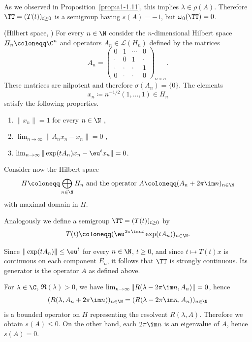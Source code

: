 As we observed in Proposition~\ref{prop:a1-1.11}, this implies $\lambda \in \rho(A)$.
Therefore $\TT = (T(t))_{t\geq 0}$ is a semigroup having $s(A) = -1$, but $\omega_{0}(\TT) = 0$.
\begin{example}\label{ex:a3-1.4}(Hilbert space, \textcite{zabczyk:1975})
For every $n \in \N$ consider the $n$-dimensional Hilbert space $H_{n} \coloneqq \C^{n}$ and operators $A_{n} \in \mathcal{L}(H_{n})$ defined by the matrices
\[
    A_{n} =
    \begin{pmatrix}
    0 & 1 & \cdots & 0 \\
    \cdot & 0 & 1 & \cdot \\
    \cdot & \cdot & \cdot & 1 \\
    0 & \cdot & \cdot & 0
    \end{pmatrix}_{n \times n} .
\]
These matrices are nilpotent and therefore $\sigma(A_{n}) = \{0\}$.
The elements 
\[
	x_{n} \coloneqq n^{-1/2}(1, \ldots, 1) \in H_{n}
\]
satisfy the following properties.
\begin{enumerate}[\upshape (i)]
\item
	$\|x_{n}\| = 1$ for every $n \in \N$ , 

\item
	$\lim_{n \to \infty} \|A_{n}x_{n} - x_{n}\| = 0$ , 

\item
	$\lim_{n \to \infty} \|\exp(tA_{n})x_{n} - \eu^{t}x_{n}\| = 0$. 

\end{enumerate}
Consider now the Hilbert space 
%
\[
	\text{$H \coloneqq \bigoplus_{n \in \N} H_{n}$ and the operator 
		$A \coloneqq (A_{n} + 2\pi\im n)_{n \in \N}$}
\]
%
with maximal domain in $H$.

Analogously we define a semigroup $\TT = (T(t))_{t \geq 0}$ by
\[
    T(t) \coloneqq (\eu^{2\pi\im nt}\exp(tA_{n}))_{n \in \N} .
\]
\end{example}
Since $\|\exp(tA_{n})\| \leq \eu^{t}$ for every $n \in \N$, $t \geq 0$, and since $t \mapsto T(t)x$ is continuous on each component $E_{n}$, it follows that $\TT$ is strongly continuous.
Its generator is the operator $A$ as defined above.

For $\lambda \in \C$, $\Re(\lambda) > 0$, we have 
$\lim_{n \to \infty} \|R(\lambda-2\pi\im n,A_{n})\| = 0$, hence
\[
    (R(\lambda,A_{n}+2\pi\im n))_{n \in \N} = (R(\lambda-2\pi\im n,A_{n}))_{n \in \N}
\]
is a bounded operator on $H$ representing the resolvent $R(\lambda,A)$.
Therefore we obtain $s(A) \leq 0$.
On the other hand, each $2\pi\im n$ is an eigenvalue of\/ $A$, hence $s(A) = 0$.

